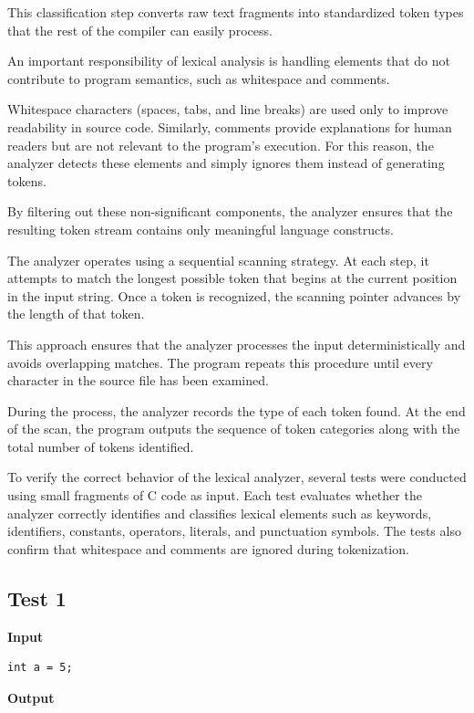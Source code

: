 \documentclass[letterpaper,12pt,oneside]{article}
\begin{document}
This classification step converts raw text fragments into standardized token types that the rest of the compiler can easily process.

An important responsibility of lexical analysis is handling elements that do not contribute to program semantics, such as whitespace and comments.

Whitespace characters (spaces, tabs, and line breaks) are used only to improve readability in source code. Similarly, comments provide explanations for human readers but are not relevant to the program's execution. For this reason, the analyzer detects these elements and simply ignores them instead of generating tokens.

By filtering out these non-significant components, the analyzer ensures that the resulting token stream contains only meaningful language constructs.

The analyzer operates using a sequential scanning strategy. At each step, it attempts to match the longest possible token that begins at the current position in the input string. Once a token is recognized, the scanning pointer advances by the length of that token.

This approach ensures that the analyzer processes the input deterministically and avoids overlapping matches. The program repeats this procedure until every character in the source file has been examined.

During the process, the analyzer records the type of each token found. At the end of the scan, the program outputs the sequence of token categories along with the total number of tokens identified.

To verify the correct behavior of the lexical analyzer, several tests were conducted using small fragments of C code as input. Each test evaluates whether the analyzer correctly identifies and classifies lexical elements such as keywords, identifiers, constants, operators, literals, and punctuation symbols. The tests also confirm that whitespace and comments are ignored during tokenization.

\subsection{Test 1}

\textbf{Input}

\begin{verbatim}
int a = 5;
\end{verbatim}

\textbf{Output}
\end{document}

